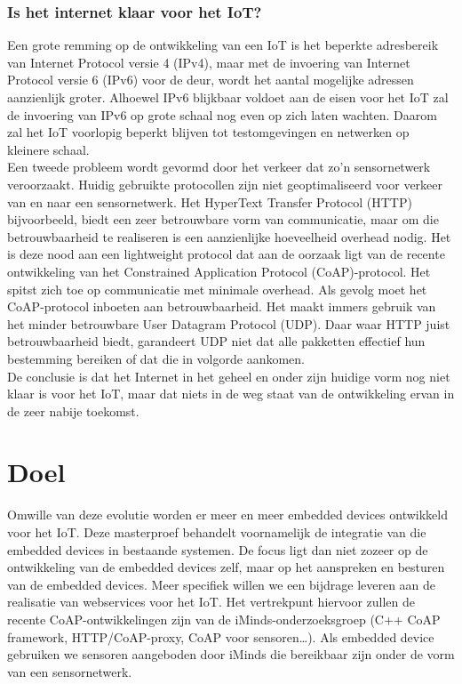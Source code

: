 \subsubsection{Is het internet klaar voor het IoT?}
Een grote remming op de ontwikkeling van een IoT is het beperkte adresbereik van Internet Protocol versie 4 (IPv4), maar met de invoering van Internet Protocol versie 6 (IPv6) voor de deur, wordt het aantal mogelijke adressen aanzienlijk groter.
Alhoewel IPv6 blijkbaar voldoet aan de eisen voor het IoT zal de invoering van IPv6 op grote schaal nog even op zich laten wachten. Daarom zal het IoT voorlopig beperkt blijven tot testomgevingen en netwerken op kleinere schaal.\\
Een tweede probleem wordt gevormd door het verkeer dat zo'n sensornetwerk veroorzaakt. Huidig gebruikte protocollen zijn niet geoptimaliseerd voor verkeer van en naar een sensornetwerk. Het HyperText Transfer Protocol (HTTP) bijvoorbeeld, biedt een zeer betrouwbare vorm van communicatie, maar om die betrouwbaarheid te realiseren is een aanzienlijke hoeveelheid overhead nodig. Het is deze nood aan een lightweight protocol dat aan de oorzaak ligt van de recente ontwikkeling van het Constrained Application Protocol (CoAP)-protocol. Het spitst zich toe op communicatie met minimale overhead. Als gevolg moet het CoAP-protocol inboeten aan betrouwbaarheid. Het maakt immers gebruik van het minder betrouwbare User Datagram Protocol (UDP). Daar waar HTTP juist betrouwbaarheid biedt, garandeert UDP niet dat alle pakketten effectief hun bestemming bereiken of dat die in volgorde aankomen.\\
De conclusie is dat het Internet in het geheel en onder zijn huidige vorm nog niet klaar is voor het IoT, maar dat niets in de weg staat van de ontwikkeling ervan in de zeer nabije toekomst.

\section{Doel}

Omwille van deze evolutie worden er meer en meer embedded devices ontwikkeld voor het IoT. Deze masterproef behandelt voornamelijk de integratie van die embedded devices in bestaande systemen. De focus ligt dan niet zozeer op de ontwikkeling van de embedded devices zelf, maar op het aanspreken en besturen van de embedded devices. Meer specifiek willen we een bijdrage leveren aan de realisatie van webservices voor het IoT. Het vertrekpunt hiervoor zullen de recente CoAP-ontwikkelingen zijn van de iMinds-onderzoeksgroep (C++ CoAP framework, HTTP/CoAP-proxy, CoAP voor sensoren…). Als embedded device gebruiken we sensoren aangeboden door iMinds die bereikbaar zijn onder de vorm van een sensornetwerk.\\

